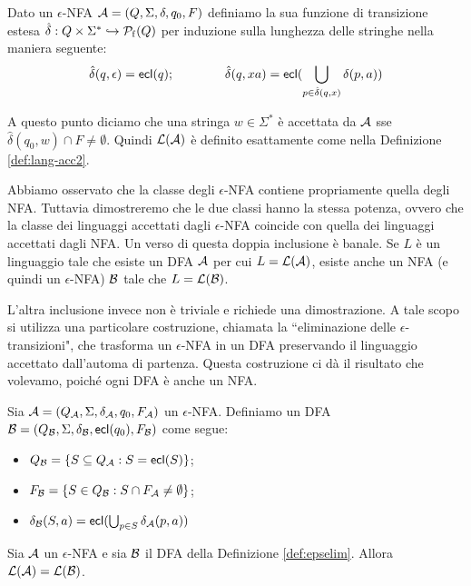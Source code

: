 \documentclass[runningheads,a4paper]{llncs}
\begin{document}
\begin{definition}\label{def:trans-est3}
Dato un $\epsilon$-NFA $\mathcal{A} = (Q,\Sigma,\delta,q_0,F)$ definiamo la sua funzione di transizione estesa $\hat{\delta}: Q \times \Sigma^* \hookrightarrow \mathcal{P}_\mathrm{f}(Q)$ per induzione sulla lunghezza delle stringhe nella maniera seguente:
$$ \hat{\delta}(q,\epsilon) = \mathsf{ecl}(q) ; \qquad \qquad \hat{\delta}(q,xa) = \mathsf{ecl}(\bigcup_{p \in \hat{\delta}(q,x)} \delta(p,a)) $$
\end{definition}

A questo punto diciamo che una stringa $w \in \Sigma^*$ \`{e} accettata da $\mathcal{A}$ sse $\hat{\delta}(q_0,w) \cap F \neq \emptyset$. Quindi $\mathcal{L}(\mathcal{A})$ \`{e} definito esattamente come nella Definizione \ref{def:lang-acc2}.

Abbiamo osservato che la classe degli $\epsilon$-NFA contiene propriamente quella degli NFA. Tuttavia dimostreremo che le due classi hanno la stessa potenza, ovvero che la classe dei linguaggi accettati dagli $\epsilon$-NFA coincide con quella dei linguaggi accettati dagli NFA. Un verso di questa doppia inclusione \`{e} banale. Se $L$ \`{e} un linguaggio tale che esiste un DFA $\mathcal{A}$ per cui $L = \mathcal{L}(\mathcal{A})$, esiste anche un NFA (e quindi un $\epsilon$-NFA) $\mathcal{B}$ tale che $L = \mathcal{L}(\mathcal{B})$.

L'altra inclusione invece non \`{e} triviale e richiede una dimostrazione. A tale scopo si utilizza una particolare costruzione, chiamata la ``eliminazione delle $\epsilon$-transizioni", che trasforma un $\epsilon$-NFA in un DFA preservando il linguaggio accettato dall'automa di partenza. Questa costruzione ci d\`{a} il risultato che volevamo, poich\'{e} ogni DFA \`{e} anche un NFA.

\begin{definition}\label{def:epselim}
Sia $\mathcal{A} = (Q_{\mathcal{A}},\Sigma,\delta_{\mathcal{A}},q_0,F_{\mathcal{A}})$ un $\epsilon$-NFA. Definiamo un DFA $\mathcal{B} = (Q_{\mathcal{B}},\Sigma,\delta_{\mathcal{B}},\mathsf{ecl}(q_0),F_{\mathcal{B}})$ come segue:
\begin{itemize}
\item $Q_{\mathcal{B}} = \{S \subseteq Q_{\mathcal{A}} : S = \mathsf{ecl}(S) \}$;
\item $F_{\mathcal{B}} = \{S \in Q_{\mathcal{B}} : S \cap F_{\mathcal{A}} \neq \emptyset\}$;
\item $\delta_{\mathcal{B}}(S,a) = \mathsf{ecl}( \bigcup_{p \in S} \delta_{\mathcal{A}}(p,a) )$
\end{itemize}
\end{definition}

\begin{theorem}[Equivalenza]\label{thm:epselim}
Sia $\mathcal{A}$ un $\epsilon$-NFA e sia $\mathcal{B}$ il DFA della Definizione \ref{def:epselim}. Allora $\mathcal{L}(\mathcal{A}) = \mathcal{L}(\mathcal{B})$.
\end{theorem}
\end{document}
